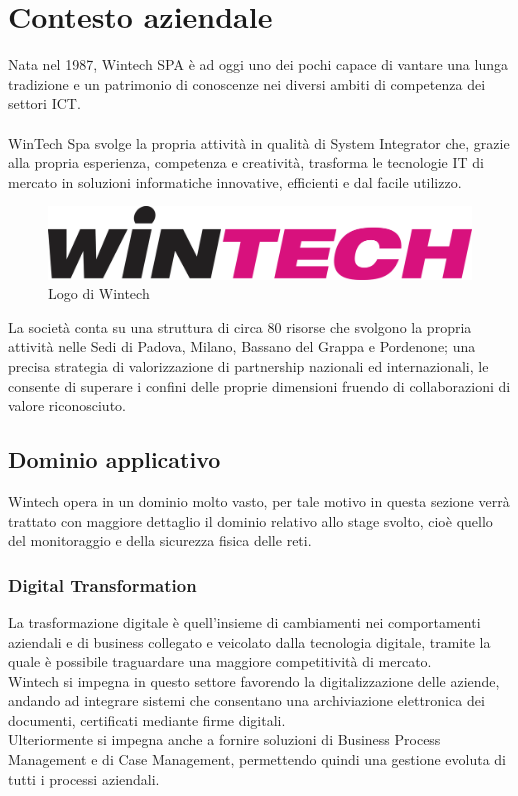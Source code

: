 \documentclass[Tesi.tex]{subfiles}
\begin{document}
\setcounter{chapter}{0}
\chapter{Contesto aziendale}

Nata nel 1987, Wintech SPA è ad oggi uno dei pochi  capace di vantare una lunga tradizione e un patrimonio di conoscenze nei diversi ambiti di competenza dei settori ICT. \\\\
WinTech Spa svolge la propria attività in qualità di System Integrator che, grazie alla propria esperienza, competenza e creatività, trasforma le tecnologie IT di mercato in soluzioni informatiche innovative, efficienti e dal facile utilizzo.\\
\begin{figure}[H]
	\centering
	\includegraphics[width=0.9\linewidth]{"images/LogoWintech"}
	\caption{Logo di Wintech}
	\label{fig:Logo di Wintech}
\end{figure}

La società conta su una struttura di circa 80 risorse che svolgono la propria attività nelle Sedi di Padova, Milano, Bassano del Grappa e Pordenone; una precisa strategia di valorizzazione di partnership nazionali ed internazionali, le consente di superare i confini delle proprie dimensioni fruendo di collaborazioni di valore riconosciuto.\\

\newpage
\section{Dominio applicativo}
Wintech opera in un dominio molto vasto, per tale motivo in questa sezione verrà trattato con maggiore dettaglio il dominio relativo allo stage svolto, cioè quello del monitoraggio e della sicurezza fisica delle reti. \\

\subsection{Digital Transformation}
La trasformazione digitale è quell'insieme di cambiamenti nei comportamenti aziendali e di business collegato e veicolato dalla tecnologia digitale, tramite la quale è possibile traguardare una maggiore competitività di mercato. \\
Wintech si impegna in questo settore favorendo la digitalizzazione delle aziende, andando ad integrare sistemi che consentano una archiviazione elettronica dei documenti, certificati mediante firme digitali. \\
Ulteriormente si impegna anche a fornire soluzioni di Business Process Management e di Case Management, permettendo quindi una gestione evoluta di tutti i processi aziendali.
\end{document}
